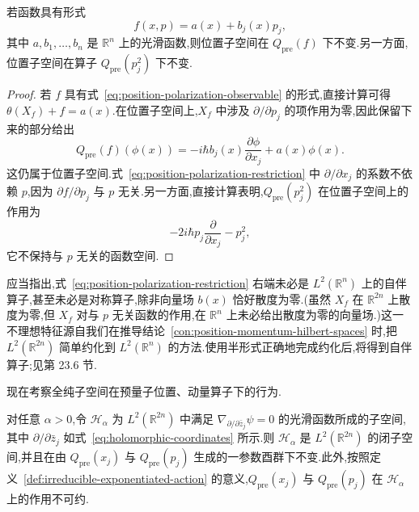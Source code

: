 \begin{proposition}[位置子空间中的可量子化函数]
\label{prop:position-polarization-affine-momentum}
若函数具有形式
\[
 f(x,p)=a(x)+b_j(x)p_j,
 \label{eq:position-polarization-observable}
\]
其中 $a,b_1,\ldots,b_n$ 是 $\mathbb R^n$ 上的光滑函数,则位置子空间在 $Q_{\mathrm{pre}}(f)$ 下不变.另一方面,位置子空间在算子 $Q_{\mathrm{pre}}(p_j^2)$ 下不变.
\end{proposition}

\begin{proof}
若 $f$ 具有式~\eqref{eq:position-polarization-observable} 的形式,直接计算可得
$\theta(X_f)+f=a(x)$.在位置子空间上,$X_f$ 中涉及 $\partial/\partial p_j$ 的项作用为零,因此保留下来的部分给出
\[
 Q_{\mathrm{pre}}(f)(\phi(x))
 =-i\hbar b_j(x)\frac{\partial\phi}{\partial x_j}+a(x)\phi(x).
 \label{eq:position-polarization-restriction}
\]
这仍属于位置子空间.式~\eqref{eq:position-polarization-restriction} 中 $\partial/\partial x_j$ 的系数不依赖 $p$,因为 $\partial f/\partial p_j$ 与 $p$ 无关.另一方面,直接计算表明,$Q_{\mathrm{pre}}(p_j^2)$ 在位置子空间上的作用为
\[
 -2i\hbar p_j\frac{\partial}{\partial x_j}-p_j^2,
\]
它不保持与 $p$ 无关的函数空间.
\end{proof}

应当指出,式~\eqref{eq:position-polarization-restriction} 右端未必是 $L^2(\mathbb R^n)$ 上的自伴算子,甚至未必是对称算子,除非向量场 $b(x)$ 恰好散度为零.(虽然 $X_f$ 在 $\mathbb R^{2n}$ 上散度为零,但 $X_f$ 对与 $p$ 无关函数的作用,在 $\mathbb R^n$ 上未必给出散度为零的向量场.)这一不理想特征源自我们在推导结论~\ref{con:position-momentum-hilbert-spaces} 时,把 $L^2(\mathbb R^{2n})$ 简单约化到 $L^2(\mathbb R^n)$ 的方法.使用半形式正确地完成约化后,将得到自伴算子;见第 23.6 节.

现在考察全纯子空间在预量子位置、动量算子下的行为.

\begin{proposition}[全纯量子空间]
\label{prop:holomorphic-quantum-space}
对任意 $\alpha>0$,令 $\mathcal H_\alpha$ 为 $L^2(\mathbb R^{2n})$ 中满足
$\nabla_{\partial/\partial\bar z_j}\psi=0$ 的光滑函数所成的子空间,其中 $\partial/\partial\bar z_j$ 如式~\eqref{eq:holomorphic-coordinates} 所示.则 $\mathcal H_\alpha$ 是 $L^2(\mathbb R^{2n})$ 的闭子空间,并且在由 $Q_{\mathrm{pre}}(x_j)$ 与 $Q_{\mathrm{pre}}(p_j)$ 生成的一参数酉群下不变.此外,按照定义~\ref{def:irreducible-exponentiated-action} 的意义,$Q_{\mathrm{pre}}(x_j)$ 与 $Q_{\mathrm{pre}}(p_j)$ 在 $\mathcal H_\alpha$ 上的作用不可约.
\end{proposition}

